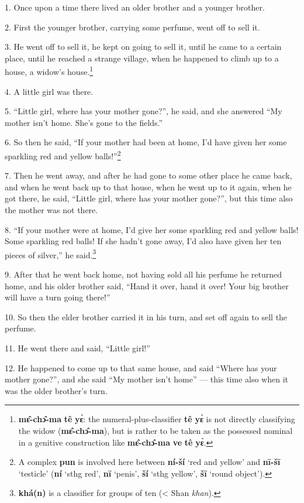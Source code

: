 \setcounter{footnote}{0}

1. Once upon a time there lived an older brother and a younger brother.

2. First the younger brother, carrying some perfume, went off to sell it.

3. He went off to sell it, he kept on going to sell it, until he came to a certain
place, until he reached a strange village, when he happened to climb up to a house,
a widow's house.\footnote{\textbf{mɛ̂-chɔ̂-ma} \textbf{tê} \textbf{yɛ̀}: the numeral-plus-classifier \textbf{tê} \textbf{yɛ̀} is not directly classifying the widow (\textbf{mɛ̂-chɔ̂-ma}), but is rather to be taken as the possessed nominal in a genitive construction like \textbf{mɛ̂-chɔ̂-ma} \textbf{ve} \textbf{tê} \textbf{yɛ̀}.}

4. A little girl was there.

5. ``Little girl, where has your mother gone?'', he said, and she answered ``My
mother isn't home. She's gone to the fields.''

6. So then he said, ``If your mother had been at home, I'd have given her some sparkling
red and yellow balls!''\footnote{A complex \textbf{pun} is involved here between \textbf{ní-ší} `red and yellow' and \textbf{nī-šī} `testicle' (\textbf{ní} `sthg red', \textbf{nī} `penis', \textbf{ší} `sthg yellow', \textbf{šī} `round object').}

7. Then he went away, and after he had gone to some other place he came back, and
when he went back up to that house, when he went up to it again, when he got there,
he said, ``Little girl, where has your mother gone?'', but this time also the mother
was not there.

8. ``If your mother were at home, I'd give her some sparkling red and yellow balls!
Some sparkling red balls! If she hadn't gone away, I'd also have given her ten
pieces of silver,'' he said.\footnote{\textbf{khá(n)} is a classifier for groups of ten (< Shan \textit{khan}).}

9. After that he went back home, not having sold all his perfume he returned home,
and his older brother said, ``Hand it over, hand it over! Your big brother will
have a turn going there!''

10. So then the elder brother carried it in his turn, and set off again to sell
the perfume.

11. He went there and said, ``Little girl!''

12. He happened to come up to that same house, and said ``Where has your mother
gone?'', and she said ``My mother isn't home'' --- this time also when it was the
older brother's turn.

